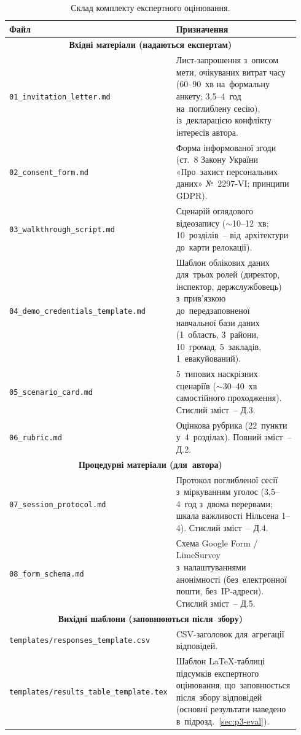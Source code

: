 \begin{table}[htbp]
\centering
\caption{Склад комплекту експертного оцінювання.}
\label{tab:eval_kit_files}
\small
\setlength\tabcolsep{4pt}
\renewcommand{\arraystretch}{1.1}
\begin{tabular}{|p{0.32\linewidth}|p{0.62\linewidth}|}
\hline
\textbf{Файл} & \textbf{Призначення} \\
\hline
\multicolumn{2}{|c|}{\textbf{Вхідні матеріали (надаються експертам)}} \\
\hline
\texttt{01\_invitation\_letter.md} & Лист-запрошення з~описом мети, очікуваних витрат часу (60--90~хв на~формальну анкету; 3,5--4~год на~поглиблену сесію), із~декларацією конфлікту інтересів автора. \\
\hline
\texttt{02\_consent\_form.md} & Форма інформованої згоди (ст.~8 Закону України «Про~захист персональних даних» №~2297-VI; принципи GDPR). \\
\hline
\texttt{03\_walkthrough\_script.md} & Сценарій оглядового відеозапису ($\sim$10--12~хв; 10~розділів~-- від~архітектури до~карти релокації). \\
\hline
\texttt{04\_demo\_credentials\_template.md} & Шаблон облікових даних для~трьох ролей (директор, інспектор, держслужбовець) з~прив'язкою до~передзаповненої навчальної бази даних (1~область, 3~райони, 10~громад, 5~закладів, 1~евакуйований). \\
\hline
\texttt{05\_scenario\_card.md} & 5~типових наскрізних сценаріїв ($\sim$30--40~хв самостійного проходження). Стислий зміст~-- Д.3. \\
\hline
\texttt{06\_rubric.md} & Оцінкова рубрика (22~пункти у~4~розділах). Повний зміст~-- Д.2. \\
\hline
\multicolumn{2}{|c|}{\textbf{Процедурні матеріали (для~автора)}} \\
\hline
\texttt{07\_session\_protocol.md} & Протокол поглибленої сесії з~міркуванням уголос (3,5--4~год з~двома перервами; шкала важливості Нільсена 1--4). Стислий зміст~-- Д.4. \\
\hline
\texttt{08\_form\_schema.md} & Схема Google Form / LimeSurvey з~налаштуваннями анонімності (без~електронної пошти, без~IP-адреси). Стислий зміст~-- Д.5. \\
\hline
\multicolumn{2}{|c|}{\textbf{Вихідні шаблони (заповнюються після~збору)}} \\
\hline
\texttt{templates/responses\_template.csv} & CSV-заголовок для~агрегації відповідей. \\
\hline
\texttt{templates/results\_table\_template.tex} & Шаблон LaTeX-таблиці підсумків експертного оцінювання, що~заповнюється після~збору відповідей (основні результати наведено в~підрозд.~\ref{sec:p3-eval}). \\

\end{tabular}
\end{table}
